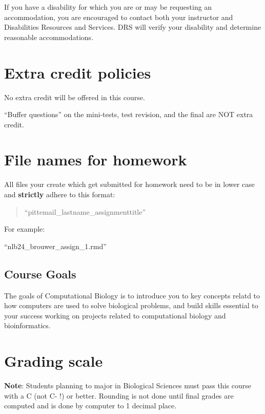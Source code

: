 \documentclass[
]{book}
\begin{document}
If you have a disability for which you are or may be requesting an accommodation, you are encouraged to contact both your instructor and Disabilities Resources and Services. DRS will verify your disability and determine reasonable accommodations.

\hypertarget{extracredit}{%
\chapter{Extra credit policies}\label{extracredit}}

No extra credit will be offered in this course.

``Buffer questions'' on the mini-tests, test revision, and the final are NOT extra credit.

\hypertarget{file_names}{%
\chapter{File names for homework}\label{file_names}}

All files your create which get submitted for homework need to be in lower case and \textbf{strictly} adhere to this format:

\begin{quote}
``pittemail\_lastname\_assignmenttitle''
\end{quote}

For example:

``nlb24\_brouwer\_assign\_1.rmd''

\hypertarget{course-goals}{%
\section{Course Goals}\label{course-goals}}

The goals of Computational Biology is to introduce you to key concepts relatd to how computers are used to solve biological problems, and build skills essential to your success working on projects related to computational biology and bioinformatics.

\hypertarget{grading-scale}{%
\chapter{Grading scale}\label{grading-scale}}

\textbf{Note}: Students planning to major in Biological Sciences must pass this course with a C (not C- !) or better. Rounding is not done until final grades are computed and is done by computer to 1 decimal place.
\end{document}
